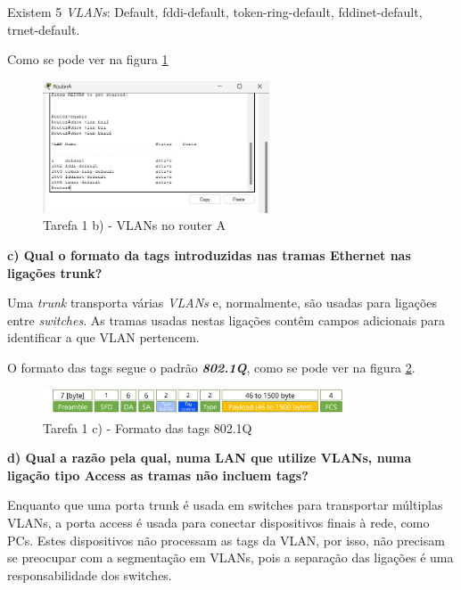 \documentclass[11pt,english, openright, oneside]{book}
\begin{document}
Existem 5 \textit{VLANs}: Default, fddi-default, token-ring-default,
fddinet-default, trnet-default.

Como se pode ver na figura \ref{fig:1b}
\vspace{0.4cm}

\begin{figure}[htp]
    \centering
    \includegraphics[width=0.6\textwidth]{imagens/Tarefa1/1.b.png}
    \caption{Tarefa 1 b) - VLANs no router A}
    \label{fig:1b}
\end{figure}

\vspace{0.8cm}


\pagebreak
\textbf{c) Qual o formato da tags introduzidas nas tramas Ethernet nas ligações trunk?}
\vspace{0.2cm}

Uma \textit{trunk} transporta várias \textit{VLANs} e, normalmente, são usadas
para ligações entre \textit{switches}. As tramas usadas nestas ligações contêm
campos adicionais para identificar a que VLAN pertencem.

O formato das tags segue o padrão \textit{\textbf{802.1Q}}, como se pode ver na
figura \ref{fig:1c}.
\vspace{0.4cm}

\begin{figure}[htp]
    \centering
    \includegraphics[width=0.8\textwidth]{imagens/Tarefa1/1.c.png}
    \caption{Tarefa 1 c) - Formato das tags 802.1Q}
    \label{fig:1c}
\end{figure} 

\vspace{0.8cm}


\textbf{d) Qual a razão pela qual, numa LAN que utilize VLANs, numa ligação tipo Access as tramas não incluem tags?}
\vspace{0.2cm}

Enquanto que uma porta trunk é usada em switches para transportar múltiplas
VLANs, a porta access é usada para conectar dispositivos finais à rede, como
PCs. Estes dispositivos não processam as tags da VLAN, por isso, não precisam se
preocupar com a segmentação em VLANs, pois a separação das ligações é uma
responsabilidade dos switches.
\vspace{0.8cm}
\end{document}
